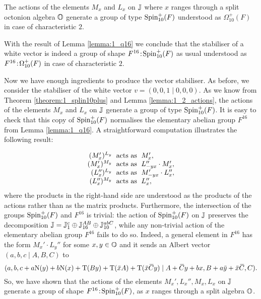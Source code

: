 \begin{theorem}
	\label{theorem:1_splin10plus}
	The actions of the elements $M_x$ and $L_x$ on $\mathbb{J}$ where $x$ ranges through a 
	split octonion algebra $\mathbb{O}$
	generate a group of type $\mathrm{Spin}_{10}^+(F)$ understood as $\Omega_{10}^+(F)$
	in case of characteristic $2$. 
\end{theorem}

With the result of Lemma \ref{lemma:1_q16} we conclude that the stabiliser of a white
vector is indeed a group of shape
$F^{16}\mathord{{\;\!{:}\;\!}}\mathrm{Spin}_{10}^+(F)$ as usual understood as $F^{16}\mathord{{\;\!{:}\;\!}}\Omega_{10}^+(F)$ in case of
characteristic $2$. 

Now we have enough ingredients to produce the vector stabiliser. As before, we consider the stabiliser of the white
    vector $v = (0,0,1\mid 0,0,0)$.
As we know from Theorem \ref{theorem:1_splin10plus} and Lemma \ref{lemma:1_2_actions}, 
the actions of the elements $M_x$ and $L_x$ on $\mathbb{J}$ generate a group of type 
$\mathrm{Spin}_{10}^+(F)$. It is easy to check
 that this copy of $\mathrm{Spin}_{10}^+(F)$ normalises the elementary abelian
group $F^{16}$ from Lemma \ref{lemma:1_q16}. A straightforward computation
illustrates the following result:

\begin{equation}
	\begin{array}{r@{\;}c@{\;}l}
		(M_x')^{L_y} & \text{ acts as } & M_x', \\
		(M_x')^{M_y} & \text{ acts as } &  L_{-yx}'' \cdot M_x', \\
		(L_x'')^{L_y} & \text{ acts as } & M_{-yx}' \cdot L_x'', \\
		(L_x'')^{M_y} & \text{ acts as } & L_x'', \\
	\end{array}
\end{equation}
where the products in the right-hand side are understood as the products of the actions rather
than as the matrix products. Furthermore, the intersection
of the groups $\mathrm{Spin}_{10}^+(F)$ and $F^{16}$ is trivial: the action of $\mathrm{Spin}_{10}^+(F)$ on
$\mathbb{J}$
preserves the decomposition $\mathbb{J} = \mathbb{J}_{1}^c \oplus \mathbb{J}_{16}^{AB} \oplus \mathbb{J}_{10}^{abC}$,
while any non-trivial action of the elementary abelian group $F^{16}$ fails to do so.
Indeed, a general element in $F^{16}$ has the form $M_x' \cdot L_y''$ for some $x,y \in 
\mathbb{O}$ and it sends an Albert vector $(a,b,c\mid A,B,C)$ to 
\begin{equation*}
	(a,b,c+a\NN(y)+b\NN(x) + \Tr(By) + \Tr(\ovx A) + \Tr(\ovx \ovC y) \mid
			A+\ovC y + bx, B+a\ovy + \ovx \ovC, C ).
\end{equation*}
So, we have shown that the actions of the elements $M_x', L_x'', M_x, L_x$ on $\mathbb{J}$ generate
a group of shape $F^{16}\mathord{{\;\!{:}\;\!}}\mathrm{Spin}_{10}^+(F)$, as $x$ ranges through a split algebra $\mathbb{O}$.


